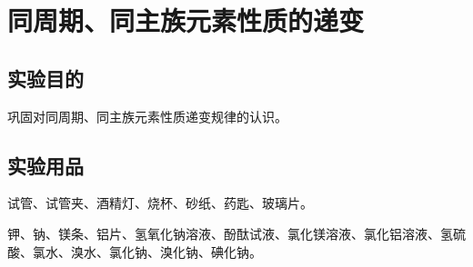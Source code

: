 \section{同周期、同主族元素性质的递变}
\subsection*{实验目的}
巩固对同周期、同主族元素性质递变规律的认识。

\subsection*{实验用品}
试管、试管夹、酒精灯、烧杯、砂纸、药匙、玻璃片。

钾、钠、镁条、铝片、氢氧化钠溶液、酚酞试液、氯化镁溶液、氯化铝溶液、氢硫酸、氯水、溴水、氯化钠、溴化钠、碘化钠。

